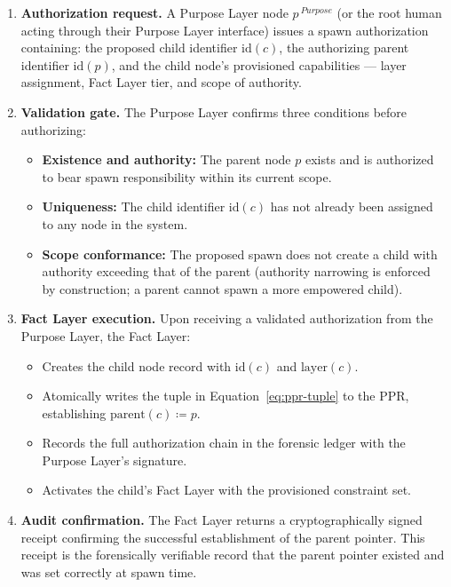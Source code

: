 \begin{enumerate}

\item \textbf{Authorization request.} A Purpose Layer node $p^{\ Purpose}$ (or the root human acting through their Purpose Layer interface) issues a spawn authorization containing: the proposed child identifier $\text{id}(c)$, the authorizing parent identifier $\text{id}(p)$, and the child node's provisioned capabilities --- layer assignment, Fact Layer tier, and scope of authority.

\item \textbf{Validation gate.} The Purpose Layer confirms three conditions before authorizing:
\begin{itemize}
\item \textbf{Existence and authority:} The parent node $p$ exists and is authorized to bear spawn responsibility within its current scope.
\item \textbf{Uniqueness:} The child identifier $\text{id}(c)$ has not already been assigned to any node in the system.
\item \textbf{Scope conformance:} The proposed spawn does not create a child with authority exceeding that of the parent (authority narrowing is enforced by construction; a parent cannot spawn a more empowered child).
\end{itemize}

\item \textbf{Fact Layer execution.} Upon receiving a validated authorization from the Purpose Layer, the Fact Layer:
\begin{itemize}
\item Creates the child node record with $\text{id}(c)$ and $\text{layer}(c)$.
\item Atomically writes the tuple in Equation~\ref{eq:ppr-tuple} to the PPR, establishing $\text{parent}(c) \coloneqq p$.
\item Records the full authorization chain in the forensic ledger with the Purpose Layer's signature.
\item Activates the child's Fact Layer with the provisioned constraint set.
\end{itemize}

\item \textbf{Audit confirmation.} The Fact Layer returns a cryptographically signed receipt confirming the successful establishment of the parent pointer. This receipt is the forensically verifiable record that the parent pointer existed and was set correctly at spawn time.

\end{enumerate}

